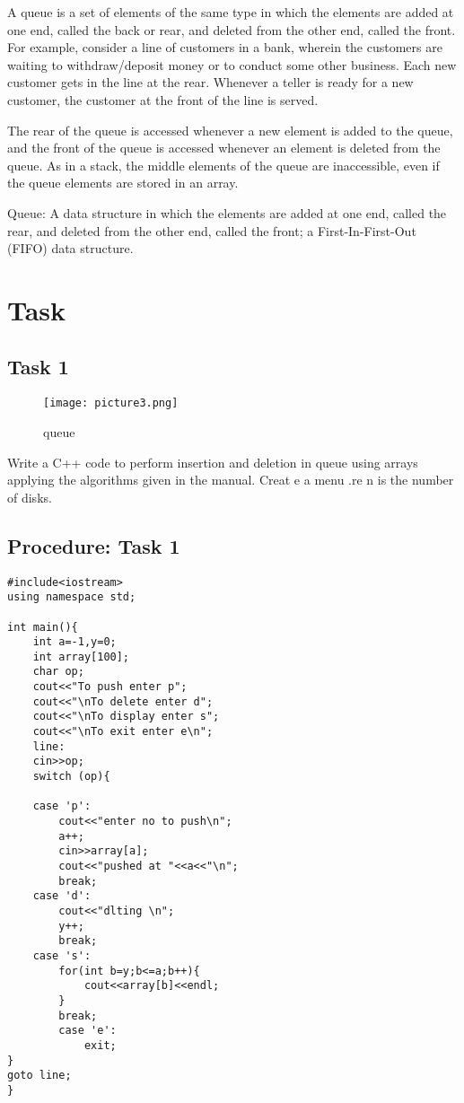 \documentclass[11pt]{article}            %
\begin{document}
A queue is a set of elements of the same type in which the elements are added at one end, called 
the back or rear, and deleted from the other end, called the front. For example, consider a line 
of  customers  in a  bank,  wherein  the  customers are waiting  to  withdraw/deposit  money or to 
conduct some other business. Each new customer gets in the line at the rear. Whenever a teller 
is ready for a new customer, the customer at the front of the line is served. 
 
The rear of the queue is accessed whenever a new element is added to the queue, and the front 
of  the queue is  accessed whenever an element  is deleted  from the queue.  As  in a  stack, the 
middle elements of the queue are inaccessible, even if the queue elements are stored in an array. 
 
Queue: A data structure in which the elements are added at one end, called the rear, and deleted 
from the other end, called the front; a First-In-First-Out (FIFO) data structure. 
 


\section{Task}  
\subsection{ Task 1 }     

\begin{figure*}
\centering
  \texttt{[image: picture3.png]}
\caption{queue}
\label{Figure:3}    
\end{figure*}
Write  a  C++  code  to  perform  insertion  and  deletion  in  queue using arrays applying 
the algorithms given in the manual. Creat e a menu .re n is the number of disks.

\subsection{Procedure: Task 1 }     

\begin{lstlisting}
#include<iostream>
using namespace std;

int main(){
	int a=-1,y=0;
	int array[100];
	char op;
	cout<<"To push enter p";
	cout<<"\nTo delete enter d";
	cout<<"\nTo display enter s";
	cout<<"\nTo exit enter e\n";
	line:
	cin>>op;
	switch (op){
	
	case 'p':
		cout<<"enter no to push\n";
		a++;
		cin>>array[a];
		cout<<"pushed at "<<a<<"\n";
		break;
	case 'd':
		cout<<"dlting \n";
		y++;
		break;
	case 's':
		for(int b=y;b<=a;b++){
			cout<<array[b]<<endl;
		}
		break;
		case 'e':
			exit;
}
goto line;
}


\end{lstlisting}

 
\end{document}
